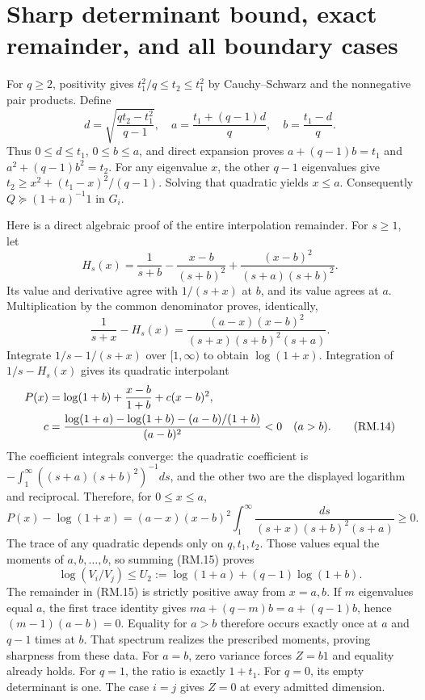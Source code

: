 \documentclass[11pt]{article}
\begin{document}
\section{Sharp determinant bound, exact remainder, and all boundary cases}
For $q\ge2$, positivity gives $t_1^2/q\le t_2\le t_1^2$ by
Cauchy--Schwarz and the nonnegative pair products. Define
\begin{equation}
 d=\sqrt{\frac{qt_2-t_1^2}{q-1}},\quad
 a=\frac{t_1+(q-1)d}{q},\quad b=\frac{t_1-d}{q}.\tag{RM.11}
\end{equation}
Thus $0\le d\le t_1$, $0\le b\le a$, and direct expansion proves
$a+(q-1)b=t_1$ and $a^2+(q-1)b^2=t_2$.
For any eigenvalue $x$, the other $q-1$ eigenvalues give
$t_2\ge x^2+(t_1-x)^2/(q-1)$. Solving that quadratic yields $x\le a$.
Consequently $Q\succeq(1+a)^{-1}1$ in $G_i$.

Here is a direct algebraic proof of the entire interpolation remainder.
For $s\ge1$, let
\begin{equation}
 H_s(x)=\frac1{s+b}-\frac{x-b}{(s+b)^2}
       +\frac{(x-b)^2}{(s+a)(s+b)^2}.\tag{RM.12}
\end{equation}
Its value and derivative agree with $1/(s+x)$ at $b$, and its value
agrees at $a$. Multiplication by the common denominator proves, identically,
\begin{equation}
 \frac1{s+x}-H_s(x)
 =\frac{(a-x)(x-b)^2}{(s+x)(s+b)^2(s+a)}.\tag{RM.13}
\end{equation}
Integrate $1/s-1/(s+x)$ over $[1,\infty)$ to obtain $\log(1+x)$.
Integration of $1/s-H_s(x)$ gives its quadratic interpolant
\begin{align}
 P(x)&=\log(1+b)+\frac{x-b}{1+b}+c(x-b)^2,\notag\\
 c&=\frac{\log(1+a)-\log(1+b)-(a-b)/(1+b)}{(a-b)^2}<0\quad(a>b).
 \tag{RM.14}
\end{align}
The coefficient integrals converge: the quadratic coefficient is
$-\int_1^\infty((s+a)(s+b)^2)^{-1}ds$, and the other two are the
displayed logarithm and reciprocal. Therefore, for $0\le x\le a$,
\begin{equation}
 P(x)-\log(1+x)=(a-x)(x-b)^2
 \int_1^\infty\frac{ds}{(s+x)(s+b)^2(s+a)}\ge0.\tag{RM.15}
\end{equation}
The trace of any quadratic depends only on $q,t_1,t_2$. Those values
equal the moments of $a,b,\ldots,b$, so summing (RM.15) proves
\begin{equation}
 \log(V_i/V_j)\le U_2:=\log(1+a)+(q-1)\log(1+b).\tag{RM.16}
\end{equation}
The remainder in (RM.15) is strictly positive away from $x=a,b$. If $m$ eigenvalues
equal $a$, the first trace identity gives
$ma+(q-m)b=a+(q-1)b$, hence $(m-1)(a-b)=0$. Equality for $a>b$
therefore occurs exactly once at $a$ and $q-1$ times at $b$.
That spectrum realizes the prescribed moments, proving sharpness from
these data. For $a=b$, zero variance forces $Z=b1$ and equality already
holds. For $q=1$, the ratio is exactly $1+t_1$. For $q=0$, its empty
determinant is one. The case $i=j$ gives $Z=0$ at every admitted dimension.
\end{document}
